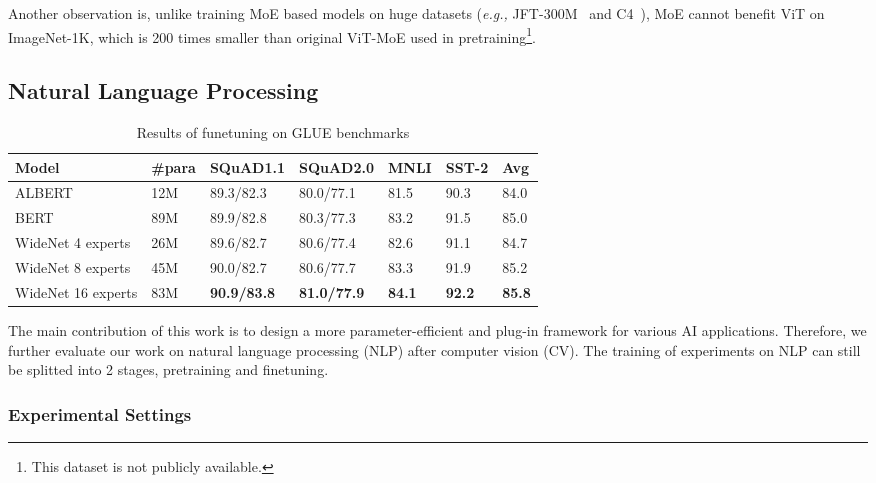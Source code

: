 \documentclass[letterpaper]{article} \usepackage{aaai22}  \usepackage{times}  \usepackage{helvet}  \usepackage{courier}  \usepackage[hyphens]{url}  \usepackage{graphicx} \urlstyle{rm} \def\UrlFont{\rm}  \usepackage{natbib}  \usepackage{caption} \DeclareCaptionStyle{ruled}{labelfont=normalfont,labelsep=colon,strut=off} \frenchspacing  \setlength{\pdfpagewidth}{8.5in}  \setlength{\pdfpageheight}{11in}  \usepackage{algorithm}
\newcommand{\eg}{\emph{e.g.,}\xspace}
\begin{document}
Another observation is, unlike training MoE based models on huge datasets (\eg JFT-300M~\citep{sun2017revisiting} and C4~\citep{raffel2019exploring}), MoE cannot benefit ViT on ImageNet-1K, which is 200 times smaller than original ViT-MoE used in pretraining\footnote{This dataset is not publicly available.}.


\subsection{Natural Language Processing}
\label{sec:nlp}




\begin{table*}[t]
\centering
\caption{Results of funetuning on GLUE benchmarks}
\label{tbl-nlp-finetune}
\begin{tabular}{l|lllll|l}
\toprule
Model                   & \#para & SQuAD1.1 & SQuAD2.0 & MNLI & SST-2  & Avg\\ \midrule
ALBERT                & 12M    & 89.3/82.3 & 80.0/77.1 & 81.5 & 90.3 & 84.0 \\
BERT                  & 89M    & 89.9/82.8 & 80.3/77.3 & 83.2 & 91.5  & 85.0\\  \midrule
WideNet 4 experts  & 26M    & 89.6/82.7 & 80.6/77.4 &  82.6 & 91.1  & 84.7 \\ 
WideNet 8 experts  & 45M    & 90.0/82.7 & 80.6/77.7 & 83.3 & 91.9 &  85.2 \\ 

WideNet 16 experts & 83M    & \textbf{90.9/83.8} & \textbf{81.0/77.9} & \textbf{84.1} & \textbf{92.2}  & \textbf{85.8}\\
\bottomrule
\end{tabular}
\end{table*}









The main contribution of this work is to design a more parameter-efficient and plug-in framework for various AI applications. Therefore, we further evaluate our work on natural language processing (NLP) after computer vision (CV). The training of experiments on NLP can still be splitted into 2 stages, pretraining and finetuning. 

\subsubsection{Experimental Settings}
\label{sec:nlp-settings}
\end{document}

